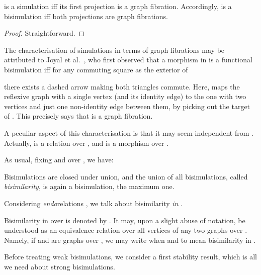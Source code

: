 \documentclass{LMCS}
\theoremstyle{plain}\newtheorem{satz}[thm]{Satz}
\begin{document}
\begin{prop}
   is a simulation iff its first projection  is a  graph fibration.  Accordingly,  is a
  bisimulation iff both projections are  graph fibrations.
\end{prop}
\begin{proof}
  Straightforward.
\end{proof}\enlargethispage{3\baselineskip}
\begin{rem}\label{rem:joyal}
  The characterisation of simulations in terms of  graph fibrations may
  be attributed to Joyal et al.~\cite{DBLP:conf/lics/JoyalNW93}, who first observed
   that a morphism  in  is a functional bisimulation iff
   for any commuting square as the exterior of
   \begin{center}
  \end{center}
  there exists a dashed arrow making both triangles commute.  Here,
   maps the reflexive
  graph with a single vertex (and its identity edge) to the one with
  two vertices and just one non-identity edge  between them, by
  picking out the target of .
  This precisely says that  is a  graph fibration.

  A peculiar aspect of this characterisation is that it may seem
  independent from . Actually,  is a relation over , and  is a morphism over .
\end{rem}

As usual, fixing  and  over , we have:
\begin{prop}
  Bisimulations are closed under union, and the union of all
  bisimulations, called \emph{bisimilarity}, is again a bisimulation,
  the maximum one. 
\end{prop}
Considering \emph{endo}relations , we talk about
bisimilarity \emph{in} .
\begin{notation}
  Bisimilarity in  over  is denoted by . It may, upon
  a slight abuse of notation, be understood as an equivalence relation
  over all vertices of any two graphs over . Namely, if  and
   are graphs over , we may write  when 
  and  to mean bisimilarity in .
\end{notation}

Before treating weak bisimulations, we consider a first stability result,
which is all we need about strong bisimulations.
\end{document}

